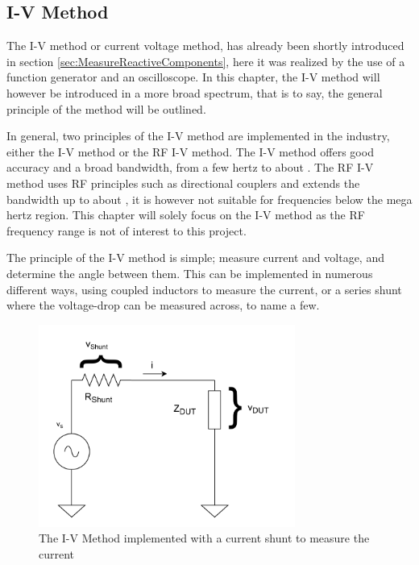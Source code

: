 \subsection{I-V Method} \label{ssec:IVMethod}
The I-V method or current voltage method, has already been shortly introduced in section \ref{sec:MeasureReactiveComponents}, here it was realized by the use of a function generator and an oscilloscope. In this chapter, the I-V method will however be introduced in a more broad spectrum, that is to say, the general principle of the method will be outlined.

In general, two principles of the I-V method are implemented in the industry, either the I-V method or the RF I-V method. The I-V method offers good accuracy 
and a broad bandwidth, from a few hertz to about . The RF I-V method uses RF principles such as directional couplers and extends the bandwidth up to about , it is however not suitable for frequencies below the mega hertz region\cite{Keysight_Impedance}. This chapter will solely focus on the I-V method as the RF frequency range is not of interest to this project.

The principle of the I-V method is simple; measure current and voltage, and determine the angle between them. This can be implemented in numerous different ways, using coupled inductors to measure the current, or a series shunt where the voltage-drop can be measured across, to name a few. 

\begin{figure}[H]
    \centering
    \includegraphics[width=0.75\textwidth]{Sections/4_TechnicalAnalysis/Figures_JFT/IV_Method.pdf}
    \caption{The I-V Method implemented with a current shunt to measure the current}
    \label{fig_4_2_IVMethod}
\end{figure}

